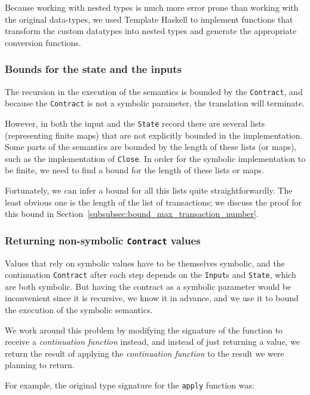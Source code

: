 \documentclass[runningheads]{llncs}
\begin{document}
\noindent
Because working with nested types is much more error prone than working with the original data-types, we used Template Haskell \cite{sheard2002template} to implement functions that transform the custom datatypes into nested types and generate the appropriate conversion functions.

\subsubsection{Bounds for the state and the inputs}

The recursion in the execution of the semantics is bounded by the \texttt{Contract}, and because the \texttt{Contract} is not a symbolic parameter, the translation will terminate.

However, in both the input and the \texttt{State} record there are several lists (representing finite maps) that are not explicitly bounded in the implementation. Some parts of the semantics are bounded by the length of these lists (or maps), such as the implementation of \texttt{Close}.
In order for the symbolic implementation to be finite, we need to find a bound for the length of these lists or maps.

Fortunately, we can infer a bound for all this lists quite straightforwardly. The least obvious one is the length of the list of transactions; we discuss the proof for this bound in Section~\ref{subsubsec:bound_max_transaction_number}.

\subsubsection{Returning non-symbolic \texttt{Contract} values}

Values that rely on symbolic values have to be themselves symbolic, and the continuation \texttt{Contract} after each step depends on the \texttt{Input}s and \texttt{State}, which are both symbolic. But having the contract as a symbolic parameter would be inconvenient since it is recursive, we know it in advance, and we use it to bound the execution of the symbolic semantics.

We work around this problem by modifying the signature of the function to receive a \textit{continuation function} instead, and instead of just returning a value, we return the result of applying the \textit{continuation function} to the result we were planning to return.

For example, the original type signature for the \texttt{apply} function was:
\end{document}
